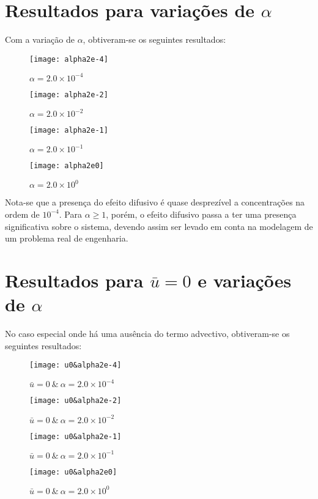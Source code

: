 \section{Resultados para variações de $\alpha$}
Com a variação de $\alpha$, obtiveram-se os seguintes resultados:
\begin{figure}[H]
    \centering
    \texttt{[image: alpha2e-4]}
    \caption{$\alpha = 2.0\times10^{-4}$}
\end{figure}
\begin{figure}[H]
    \centering
    \texttt{[image: alpha2e-2]}
    \caption{$\alpha = 2.0\times10^{-2}$}
\end{figure}
\begin{figure}[H]
    \centering
    \texttt{[image: alpha2e-1]}
    \caption{$\alpha = 2.0\times10^{-1}$}
\end{figure}
\begin{figure}[H]
    \centering
    \texttt{[image: alpha2e0]}
    \caption{$\alpha = 2.0\times10^{0}$}
\end{figure}

Nota-se que a presença do efeito difusivo é quase desprezível a concentrações
na ordem de $10^{-4}$. Para $\alpha \geq 1$, porém, o efeito difusivo passa a
ter uma presença significativa sobre o sistema, devendo assim ser levado em
conta na modelagem de um problema real de engenharia.

\section{Resultados para $\bar{u}=0$ e variações de $\alpha$}
No caso especial onde há uma ausência do termo advectivo, obtiveram-se os
seguintes resultados:
\begin{figure}[H]
    \centering
    \texttt{[image: u0\&alpha2e-4]}
    \caption{$\bar{u} = 0\ \&\ \alpha = 2.0\times10^{-4}$}
\end{figure}
\begin{figure}[H]
    \centering
    \texttt{[image: u0\&alpha2e-2]}
    \caption{$\bar{u} = 0\ \&\ \alpha = 2.0\times10^{-2}$}
\end{figure}
\begin{figure}[H]
    \centering
    \texttt{[image: u0\&alpha2e-1]}
    \caption{$\bar{u} = 0\ \&\ \alpha = 2.0\times10^{-1}$}
\end{figure}
\begin{figure}[H]
    \centering
    \texttt{[image: u0\&alpha2e0]}
    \caption{$\bar{u} = 0\ \&\ \alpha = 2.0\times10^{0}$}
\end{figure}


